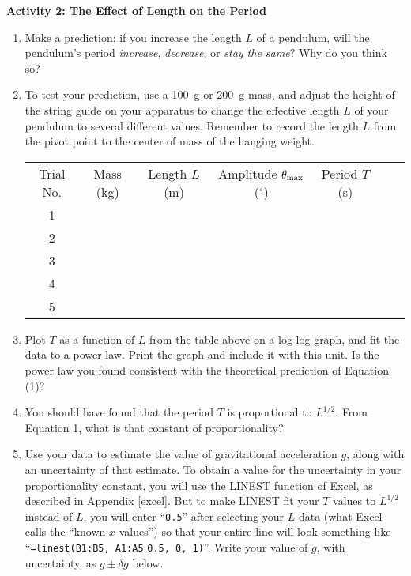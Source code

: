 \textbf{Activity 2: The Effect of Length on the Period} 

\begin{enumerate}[labparts]

\item Make a prediction: if you increase the length $L$ of a pendulum, will the pendulum's period \textit{increase}, \textit{decrease}, or \textit{stay the same}?  Why do you think so?
\answerspace{0.8in}

\item To test your prediction, use a 100~g or 200~g mass, and adjust the height of the string guide on your apparatus to change the effective length $L$ of your pendulum to several different values.  Remember to record the length $L$ from the pivot point to the center of mass of the hanging weight.  


\begin{center}
{\renewcommand{\arraystretch}{1.8}
\begin{tabular}{|c|c|c|c|c|c|c|} \hline
Trial No. & Mass (kg) & Length $L$ (m) & Amplitude $\theta_{\rm max}$ ($^\circ$) & Period $T$ (s) \\ 
\hhline{|=|=|=|=|=|}
1 & & & & \\ \hline 
2 & & & & \\ \hline 
3 & & & & \\ \hline 
4 & & & & \\ \hline 
5 & & & & \\ \hline
\end{tabular} }
\end{center}

\item Plot $T$ as a function of $L$ from the table above on a log-log graph, and fit the data to a power law.  Print the graph and include it with this unit.  Is the power law you found consistent with the theoretical prediction of Equation (1)?
\answerspace{0.6in}

\item You should have found that the period $T$ is proportional to $L^{1/2}$.  From Equation 1, what is that constant of proportionality?
\answerspace{0.4in}

\pagebreak[2]
\item Use your data to estimate the value of gravitational acceleration $g$, along with an uncertainty of that estimate.  To obtain a value for the uncertainty in your proportionality constant, you will use the LINEST function of Excel, as described in Appendix \ref{excel}.
But to make LINEST fit your $T$ values to $L^{1/2}$ instead of $L$, you will enter ``\specialcaret \verb!0.5!'' after selecting your $L$ data (what Excel calls the ``known $x$ values'') so that your entire line will look something like ``\verb!=linest(B1:B5, A1:A5! \specialcaret \verb!0.5, 0, 1)!''.  Write your value of $g$, with uncertainty, as $g \pm \delta g$ below.
\answerspace{1.4in}
\end{enumerate}

